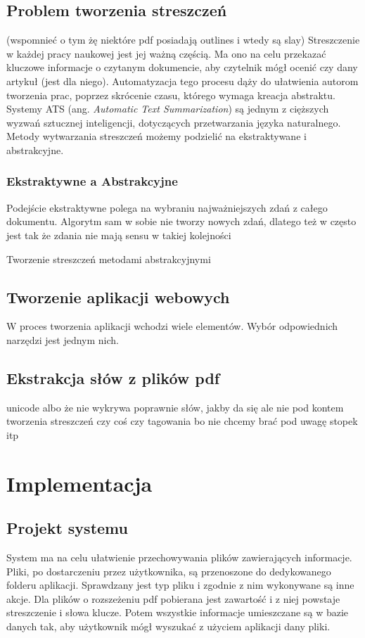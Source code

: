 \documentclass[12pt,a4paper,twoside]{article}
\begin{document}
\subsection{Problem tworzenia streszczeń}
(wspomnieć o tym żę niektóre pdf posiadają outlines i wtedy są slay)
Streszczenie w każdej pracy naukowej jest jej ważną częścią. Ma ono na celu przekazać kluczowe informacje o czytanym dokumencie, aby czytelnik mógł ocenić czy dany artykuł (jest dla niego). Automatyzacja tego procesu dąży do ułatwienia autorom tworzenia prac, poprzez skrócenie czasu, którego wymaga kreacja abstraktu. Systemy ATS (ang. \textit{Automatic Text Summarization}) są jednym z cięższych wyzwań sztucznej inteligencji, dotyczących przetwarzania języka naturalnego. Metody wytwarzania streszczeń możemy podzielić na ekstraktywane i abstrakcyjne.
\subsubsection*{Ekstraktywne a Abstrakcyjne}
Podejście ekstraktywne polega na wybraniu najważniejszych zdań z całego dokumentu. Algorytm sam w sobie nie tworzy nowych zdań, dlatego też w często jest tak że zdania nie mają sensu w takiej kolejności\par
Tworzenie streszczeń metodami abstrakcyjnymi 
\newpage
\subsection{Tworzenie aplikacji webowych}
W proces tworzenia aplikacji wchodzi wiele elementów. Wybór odpowiednich narzędzi jest jednym nich. 
\subsection{Ekstrakcja słów z plików pdf}
unicode  albo że nie wykrywa poprawnie słów, jakby da się ale nie pod kontem tworzenia streszczeń czy coś czy tagowania bo nie chcemy brać pod uwagę stopek itp
\section{Implementacja}
\subsection{Projekt systemu}
System ma na celu ułatwienie przechowywania plików zawierających informacje. Pliki, po dostarczeniu przez użytkownika, są przenoszone do dedykowanego folderu aplikacji. Sprawdzany jest typ pliku i zgodnie z nim wykonywane są inne akcje. Dla plików o rozszeżeniu pdf pobierana jest zawartość i z niej powstaje streszczenie i słowa klucze. Potem wszystkie informacje umieszczane są w bazie danych tak, aby użytkownik mógł wyszukać z użyciem aplikacji dany pliki. \par
\end{document}
